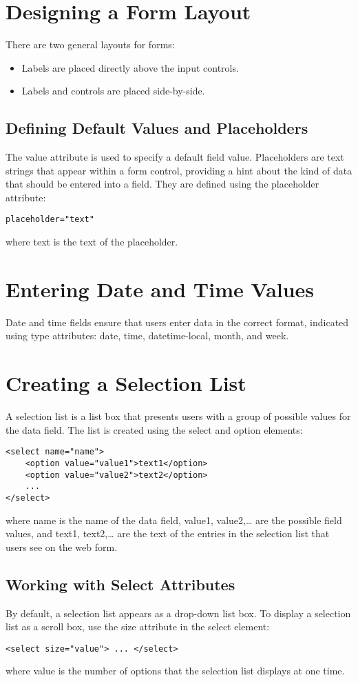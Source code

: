 \documentclass{article}
\begin{document}
\section{Designing a Form Layout}
There are two general layouts for forms:
\begin{itemize}
    \item Labels are placed directly above the input controls.
    \item Labels and controls are placed side-by-side.
\end{itemize}

\subsection{Defining Default Values and Placeholders}
The value attribute is used to specify a default field value. Placeholders are text strings that appear within a form control, providing a hint about the kind of data that should be entered into a field. They are defined using the placeholder attribute:
\begin{lstlisting}
placeholder="text"
\end{lstlisting}
where text is the text of the placeholder.

\section{Entering Date and Time Values}
Date and time fields ensure that users enter data in the correct format, indicated using type attributes: date, time, datetime-local, month, and week.

\section{Creating a Selection List}
A selection list is a list box that presents users with a group of possible values for the data field. The list is created using the select and option elements:
\begin{lstlisting}
<select name="name">
    <option value="value1">text1</option>
    <option value="value2">text2</option>
    ...
</select>
\end{lstlisting}
where name is the name of the data field, value1, value2,… are the possible field values, and text1, text2,… are the text of the entries in the selection list that users see on the web form.

\subsection{Working with Select Attributes}
By default, a selection list appears as a drop-down list box. To display a selection list as a scroll box, use the size attribute in the select element:
\begin{lstlisting}
<select size="value"> ... </select>
\end{lstlisting}
where value is the number of options that the selection list displays at one time.
\end{document}
